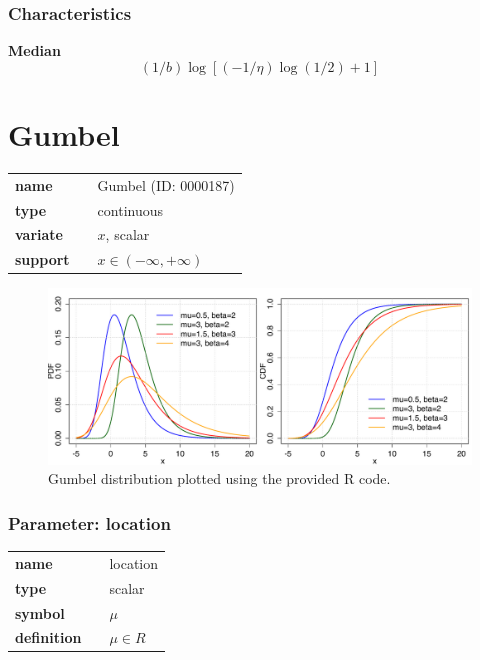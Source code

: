 \subsubsection*{Characteristics}
\smallskip \noindent \hspace{.2cm} \textbf{Median} 
\begin{equation*}\left(1/b\right)\log\left[\left(-1/\eta\right) \log\left(1/2\right)+1\right]\end{equation*}
\smallskip
\section*{Gumbel} 

  \bigskip 

\begin{tabular}{p{2cm}cl}
\textbf{name} & & Gumbel (ID: 0000187)\\ 
 
\textbf{type} & & continuous \\ 

\textbf{variate} & & $x$, scalar \\ 

\textbf{support} & & $x \in (-\infty,+\infty)$
\end{tabular}

\begin{figure}[ht!]
\centering
  \includegraphics[width=140mm]{pics/Gumbel.pdf}
 \caption{Gumbel distribution plotted using the provided R code.}
 \label{fig:Gumbel}
\end{figure}

\subsubsection*{Parameter: location}

\noindent\begin{tabular}{p{2cm}cl}
\textbf{name} & & location \\
\textbf{type} & & scalar \\
\textbf{symbol} & & $\mu$  \\
\textbf{definition} & & $\mu \in  R$
\end{tabular}

